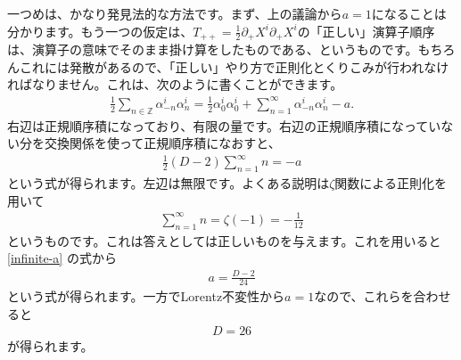 \documentclass[report,paper=a4, fontsize=12pt, line_length=16cm, number_of_lines=34,dvipdfmx]{jlreq}
\numberwithin{equation}{chapter}
\numberwithin{equation}{section}
\newcommand{\Zb}{\mathbb{Z}}
\newcommand{\del}{\partial}
\begin{document}
一つめは、かなり発見法的な方法です。まず、上の議論から$a=1$になることは分かります。もう一つの仮定は、$T_{++}=\frac12 \del_{+}X^i\del_{+}X^i$の「正しい」演算子順序は、演算子の意味でそのまま掛け算をしたものである、というものです。もちろんこれには発散があるので、「正しい」やり方で正則化とくりこみが行われなければなりません。これは、次のように書くことができます。
\begin{align}
\frac12\sum_{n\in \Zb}\alpha^i_{-n}\alpha^i_{n}=\frac12 \alpha^i_0\alpha^i_0+\sum_{n=1}^{\infty}\alpha^i_{-n}\alpha^i_{n}-a.
\end{align}
右辺は正規順序積になっており、有限の量です。右辺の正規順序積になっていない分を交換関係を使って正規順序積になおすと、
\begin{align}
\frac12(D-2)\sum_{n=1}^{\infty} n=-a\label{infinite-a}
\end{align}
という式が得られます。左辺は無限です。よくある説明は$\zeta$関数による正則化を用いて
\begin{align}
\sum_{n=1}^{\infty}n=\zeta(-1)=-\frac{1}{12}
\end{align}
というものです。これは答えとしては正しいものを与えます。これを用いると\eqref{infinite-a}
の式から
\begin{align}
a=\frac{D-2}{24}
\end{align}
という式が得られます。一方でLorentz不変性から$a=1$なので、これらを合わせると
\begin{align}
D=26
\end{align}
が得られます。
\end{document}
